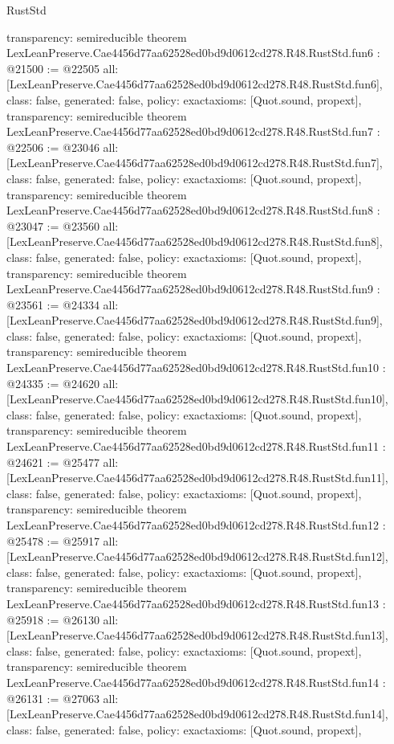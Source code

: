 \begin{lexlean}{RustStd}
\begin{coremodule}
{  transparency: semireducible
}
theorem LexLeanPreserve.Cae4456d77aa62528ed0bd9d0612cd278.R48.RustStd.fun6 : @21500 := @22505 {
  all: [LexLeanPreserve.Cae4456d77aa62528ed0bd9d0612cd278.R48.RustStd.fun6],
  class: false,
  generated: false,
  policy: exact{axioms: [Quot.sound, propext]},
  transparency: semireducible
}
theorem LexLeanPreserve.Cae4456d77aa62528ed0bd9d0612cd278.R48.RustStd.fun7 : @22506 := @23046 {
  all: [LexLeanPreserve.Cae4456d77aa62528ed0bd9d0612cd278.R48.RustStd.fun7],
  class: false,
  generated: false,
  policy: exact{axioms: [Quot.sound, propext]},
  transparency: semireducible
}
theorem LexLeanPreserve.Cae4456d77aa62528ed0bd9d0612cd278.R48.RustStd.fun8 : @23047 := @23560 {
  all: [LexLeanPreserve.Cae4456d77aa62528ed0bd9d0612cd278.R48.RustStd.fun8],
  class: false,
  generated: false,
  policy: exact{axioms: [Quot.sound, propext]},
  transparency: semireducible
}
theorem LexLeanPreserve.Cae4456d77aa62528ed0bd9d0612cd278.R48.RustStd.fun9 : @23561 := @24334 {
  all: [LexLeanPreserve.Cae4456d77aa62528ed0bd9d0612cd278.R48.RustStd.fun9],
  class: false,
  generated: false,
  policy: exact{axioms: [Quot.sound, propext]},
  transparency: semireducible
}
theorem LexLeanPreserve.Cae4456d77aa62528ed0bd9d0612cd278.R48.RustStd.fun10 : @24335 := @24620 {
  all: [LexLeanPreserve.Cae4456d77aa62528ed0bd9d0612cd278.R48.RustStd.fun10],
  class: false,
  generated: false,
  policy: exact{axioms: [Quot.sound, propext]},
  transparency: semireducible
}
theorem LexLeanPreserve.Cae4456d77aa62528ed0bd9d0612cd278.R48.RustStd.fun11 : @24621 := @25477 {
  all: [LexLeanPreserve.Cae4456d77aa62528ed0bd9d0612cd278.R48.RustStd.fun11],
  class: false,
  generated: false,
  policy: exact{axioms: [Quot.sound, propext]},
  transparency: semireducible
}
theorem LexLeanPreserve.Cae4456d77aa62528ed0bd9d0612cd278.R48.RustStd.fun12 : @25478 := @25917 {
  all: [LexLeanPreserve.Cae4456d77aa62528ed0bd9d0612cd278.R48.RustStd.fun12],
  class: false,
  generated: false,
  policy: exact{axioms: [Quot.sound, propext]},
  transparency: semireducible
}
theorem LexLeanPreserve.Cae4456d77aa62528ed0bd9d0612cd278.R48.RustStd.fun13 : @25918 := @26130 {
  all: [LexLeanPreserve.Cae4456d77aa62528ed0bd9d0612cd278.R48.RustStd.fun13],
  class: false,
  generated: false,
  policy: exact{axioms: [Quot.sound, propext]},
  transparency: semireducible
}
theorem LexLeanPreserve.Cae4456d77aa62528ed0bd9d0612cd278.R48.RustStd.fun14 : @26131 := @27063 {
  all: [LexLeanPreserve.Cae4456d77aa62528ed0bd9d0612cd278.R48.RustStd.fun14],
  class: false,
  generated: false,
  policy: exact{axioms: [Quot.sound, propext]},
}
\end{coremodule}
\end{lexlean}
